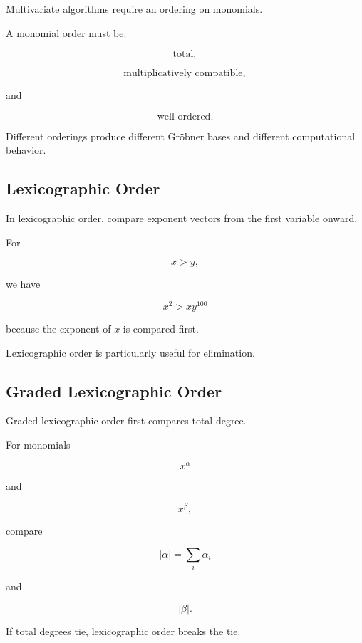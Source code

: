 Multivariate algorithms require an ordering on monomials.

A monomial order must be:

\[
\boxed{
\text{total},
}
\]

\[
\boxed{
\text{multiplicatively compatible},
}
\]

and

\[
\boxed{
\text{well ordered}.
}
\]

Different orderings produce different Gröbner bases and different
computational behavior.

\subsection{Lexicographic Order}
\label{subsec:lexicographic-order}

In lexicographic order, compare exponent vectors from the first variable
onward.

For

\[
x>y,
\]

we have

\[
\boxed{
x^2
>
xy^{100}
}
\]

because the exponent of \(x\) is compared first.

Lexicographic order is particularly useful for elimination.

\subsection{Graded Lexicographic Order}
\label{subsec:graded-lexicographic-order}

Graded lexicographic order first compares total degree.

For monomials

\[
x^\alpha
\]

and

\[
x^\beta,
\]

compare

\[
|\alpha|
=
\sum_i\alpha_i
\]

and

\[
|\beta|.
\]

If total degrees tie, lexicographic order breaks the tie.

